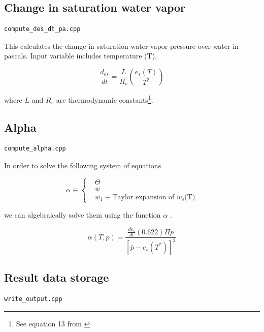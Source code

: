 \documentclass{article}
\begin{document}

\subsection{Change in saturation water vapor}
\begin{verbatim}
compute_des_dt_pa.cpp
\end{verbatim}

This calculates the change in saturation water vapor pressure over water in pascals. Input variable includes temperature (T).

\begin{equation}
\frac{d_{es}}{dt} = \frac{L}{R_{v}}\left(\frac{e_{s}\left(T\right)}{T^{2}}\right)
\end{equation}

where $L$ and $R_{v}$ are thermodynamic constants\footnote{See equation 13 from \cite{krueger}}.

\subsection{Alpha}
\begin{verbatim}
compute_alpha.cpp
\end{verbatim}

In order to solve the following system of equations

\begin{equation}
\alpha \equiv {
\begin{cases}
&\Theta\\%
&w\\%
&w_{1} \equiv \text{Taylor expansion of $w_{s}$(T)}
\end{cases}
}
\end{equation}

we can algebraically  solve them using the function $\alpha$ \cite{krueger}.

\begin{equation}
\alpha\left(T,p\right) = \frac{\frac{de_{s}}{dt}\left(0.622\right)\bar{\Pi}\bar{p}}{\left[\bar{p}-e_{s}\left(T^{*}\right)\right]^{2}}
\end{equation}


\subsection{Result data storage}
\begin{verbatim}
write_output.cpp
\end{verbatim}
\end{document}
